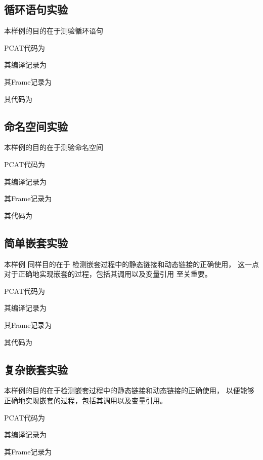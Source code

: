 ﻿\documentclass{article}
\begin{document}
\subsection{循环语句实验}
本样例的目的在于测验循环语句

PCAT代码为

其编译记录为

其Frame记录为

其代码为


\subsection{命名空间实验}
本样例的目的在于测验命名空间

PCAT代码为

其编译记录为

其Frame记录为

其代码为




\subsection{简单嵌套实验}
本样例
同样目的在于
检测嵌套过程中的静态链接和动态链接的正确使用，
这一点对于正确地实现嵌套的过程，包括其调用以及变量引用
至关重要。


PCAT代码为

其编译记录为

其Frame记录为

其代码为



\subsection{复杂嵌套实验}
本样例的目的在于检测嵌套过程中的静态链接和动态链接的正确使用，
以便能够正确地实现嵌套的过程，包括其调用以及变量引用。

PCAT代码为

其编译记录为

其Frame记录为

\end{document}
